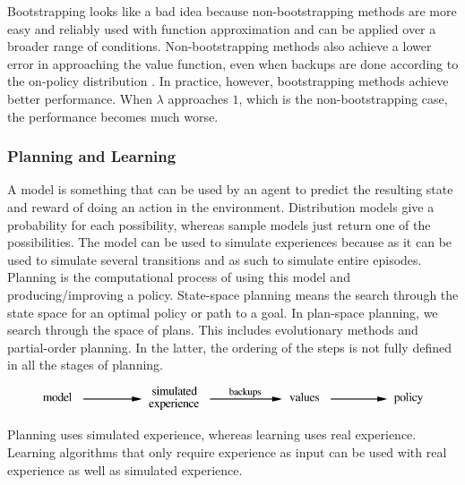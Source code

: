 \documentclass[a4paper]{article}
\begin{document}
Bootstrapping looks like a bad idea because non-bootstrapping methods are more easy and reliably used with function approximation and can be applied over a broader range of conditions. Non-bootstrapping methods also achieve a lower error in approaching the value function, even when backups are done according to the on-policy distribution \citep{ML}. In practice, however, bootstrapping methods achieve better performance. When $\lambda$ approaches $1$, which is the non-bootstrapping case, the performance becomes much worse.

\subsubsection{Planning and Learning}
A model is something that can be used by an agent to predict the resulting state and reward of doing an action in the environment. Distribution models give a probability for each possibility, whereas sample models just return one of the possibilities. The model can be used to simulate experiences because as it can be used to simulate several transitions and as such to simulate entire episodes.\\
Planning is the computational process of using this model and producing/improving a policy. State-space planning means the search through the state space for an optimal policy or path to a goal. In plan-space planning, we search through the space of plans. This includes evolutionary methods and partial-order planning. In the latter, the ordering of the steps is not fully defined in all the stages of planning.
\begin{figure}[H]
\includegraphics[width=\linewidth]{images/modelplanning.png}
\label{fig:modelplanning}
\end{figure}
Planning uses simulated experience, whereas learning uses real experience. Learning algorithms that only require experience as input can be used with real experience as well as simulated experience.\\
\end{document}

